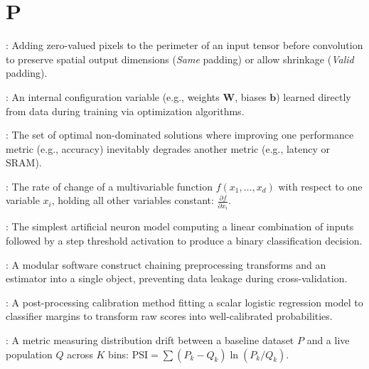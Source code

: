 \section*{P}
\begin{description}[leftmargin=!,labelwidth=4.5cm,itemsep=1.5ex]
\item[\textbf{Padding}\hfill \textnormal{\sffamily\scriptsize\color{keyideablue}[Deep Learning]}]: Adding zero-valued pixels to the perimeter of an input tensor before convolution to preserve spatial output dimensions (\emph{Same} padding) or allow shrinkage (\emph{Valid} padding).
\item[\textbf{Parameter}\hfill \textnormal{\sffamily\scriptsize\color{keyideablue}[Machine Learning]}]: An internal configuration variable (e.g., weights $\mathbf{W}$, biases $\mathbf{b}$) learned directly from data during training via optimization algorithms.
\item[\textbf{Pareto Frontier}\hfill \textnormal{\sffamily\scriptsize\color{keyideablue}[Optimization]}]: The set of optimal non-dominated solutions where improving one performance metric (e.g., accuracy) inevitably degrades another metric (e.g., latency or SRAM).
\item[\textbf{Partial Derivative}\hfill \textnormal{\sffamily\scriptsize\color{keyideablue}[Mathematics]}]: The rate of change of a multivariable function $f(x_1, \dots, x_d)$ with respect to one variable $x_i$, holding all other variables constant: $\frac{\partial f}{\partial x_i}$.
\item[\textbf{Perceptron}\hfill \textnormal{\sffamily\scriptsize\color{keyideablue}[Deep Learning]}]: The simplest artificial neuron model computing a linear combination of inputs followed by a step threshold activation to produce a binary classification decision.
\item[\textbf{Pipeline}\hfill \textnormal{\sffamily\scriptsize\color{keyideablue}[MLOps \& Engineering]}]: A modular software construct chaining preprocessing transforms and an estimator into a single object, preventing data leakage during cross-validation.
\item[\textbf{Platt Scaling}\hfill \textnormal{\sffamily\scriptsize\color{keyideablue}[Evaluation]}]: A post-processing calibration method fitting a scalar logistic regression model to classifier margins to transform raw scores into well-calibrated probabilities.
\item[\textbf{Population Stability Index (PSI)}\hfill \textnormal{\sffamily\scriptsize\color{keyideablue}[MLOps]}]: A metric measuring distribution drift between a baseline dataset $P$ and a live population $Q$ across $K$ bins: $\text{PSI} = \sum (P_k - Q_k) \ln(P_k / Q_k)$.

\end{description}
